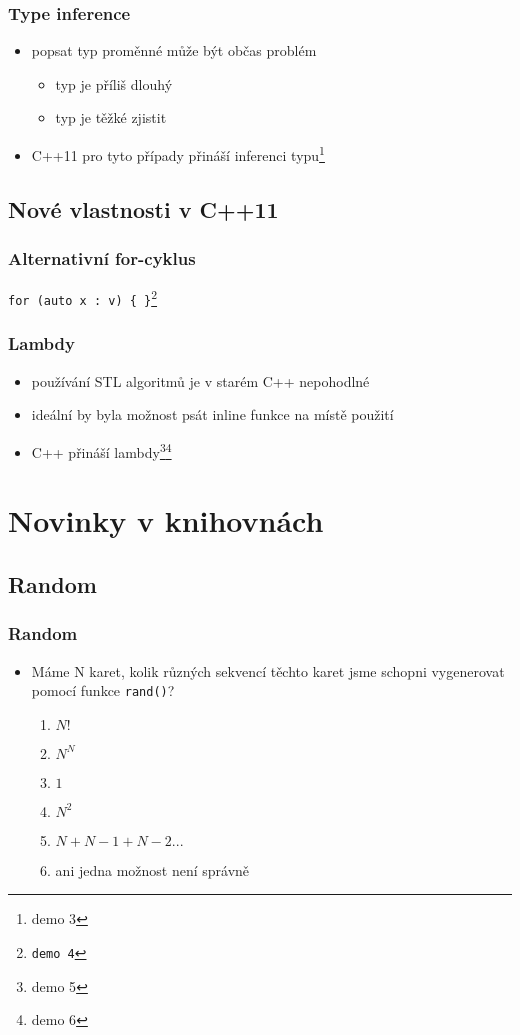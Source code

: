 \begin{frame} \frametitle{Type inference}
	\begin{itemize}
		\item popsat typ proměnné může být občas problém
		\begin{itemize}
			\item typ je příliš dlouhý
			\item typ je těžké zjistit
		\end{itemize}
		\item C++11 pro tyto případy přináší inferenci typu\footnote{demo 3}
	\end{itemize}
\end{frame}

\subsection{Nové vlastnosti v C++11}

\begin{frame} \frametitle{Alternativní for-cyklus}
	\texttt{for (auto x : v) \{ \}\footnote{demo 4}}
\end{frame}

\begin{frame} \frametitle{Lambdy}
	\begin{itemize}
		\item používání STL algoritmů je v starém C++ nepohodlné
		\item ideální by byla možnost psát inline funkce na místě použití
		\item C++ přináší lambdy\footnote{demo 5}\footnote{demo 6}
	\end{itemize}
\end{frame}


\section{Novinky v knihovnách}

\subsection{Random}

\begin{frame} \frametitle{Random}
	\begin{itemize}
		\item Máme N karet, kolik různých sekvencí těchto karet jsme schopni vygenerovat pomocí funkce \texttt{rand()}?
		\begin{enumerate}
			\item $N!$
			\item $N^N$
			\item $1$
			\item $N^2$
			\item $N + N-1 + N-2 ...$
			\item ani jedna možnost není správně
		\end{enumerate}
	\end{itemize}
\end{frame}

